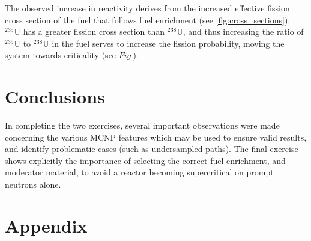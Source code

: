 \documentclass{article}
\begin{document}
    The observed increase in reactivity derives from the increased effective fission cross section of the fuel that follows fuel enrichment (see \ref{fig:cross_sections}). $^{235}\text{U}$ has a greater fission cross section than $^{238}\text{U}$, and thus increasing the ratio of $^{235}\text{U}$ to $^{238}\text{U}$ in the fuel serves to increase the fission probability, moving the system towards criticality (see $Fig~$).

\section{Conclusions}
  In completing the two exercises, several important observations were made concerning the various MCNP features which may be used to ensure valid results, and identify problematic cases (such as undersampled paths). The final exercise shows explicitly the importance of selecting the correct fuel enrichment, and moderator material, to avoid a reactor becoming supercritical on prompt neutrons alone.


\section{Appendix}
    \inputminted[linenos,breaklines]{lexer.py -x}{mcnp/1.ip}

    \inputminted[linenos,breaklines]{lexer.py -x}{mcnp/3.d.2.ip}
\end{document}
